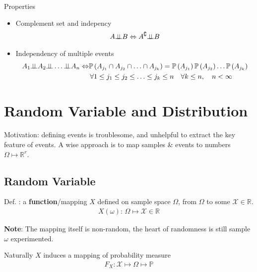    Properties
    \begin{itemize}[topsep=2pt,itemsep=0pt]
        \item Complement set and indepency
        \begin{align}
            A\bot\!\!\!\bot B\Leftrightarrow A^\complement \bot\!\!\!\bot B 
        \end{align}
        \item Independency of multiple events
        \begin{align}
            A_1\independent A_2\independent\ldots \independent A_n \Leftrightarrow &\mathbb{P}\left( A_{j_1}\cap A_{j_2}\cap\ldots\cap A_{j_k} \right)=\mathbb{P}\left( A_{j_1} \right) \mathbb{P}\left( A_{j_2} \right) \ldots \mathbb{P}\left( A_{j_k} \right) \\
            &  \,\forall 1\leq j_1\leq j_2\leq \ldots \leq j_k\leq n\quad \forall k\leq n,\quad n<\infty
        \end{align}
    \end{itemize}
    
        

\section{Random Variable and Distribution}\label{SectionPropertiesOfRandomVariableAndVector}
Motivation: defining events is troublesome, and unhelpful to extract the key feature of events. A wise approach is to map samples \& events to numbers $ \Omega \mapsto \mathbb{R}^r $.

\subsection{Random Variable}
    Def. : a \textbf{function}/mapping $X$ defined on sample space $\Omega$,  from $\Omega$ to some $\mathscr{X}\in\mathbb{R} $.
    \begin{align}
        X(\omega ):\, \Omega \mapsto \mathscr{X}\in\mathbb{R} 
    \end{align}

    \textbf{Note}: The mapping itself is non-random, the heart of randomness is still sample $ \omega  $ experimented. 

    Naturally $ X $ induces a mapping of probability measure
    \begin{align}
        F_X: \mathscr{X} \mapsto \Omega \mapsto \mathbb{P} 
    \end{align}

